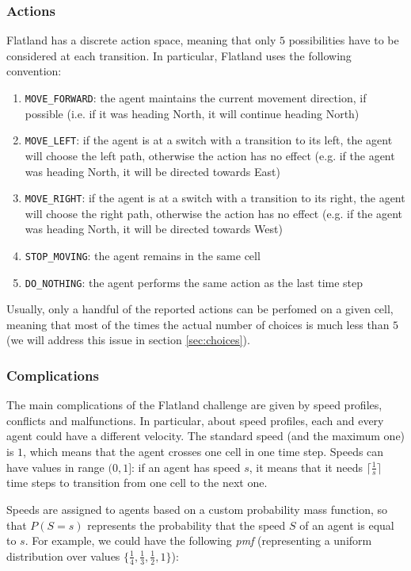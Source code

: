 \documentclass[a4paper,10pt]{report}
\begin{document}
\subsubsection*{Actions}
Flatland has a discrete action space, meaning that only $5$ possibilities have to be considered at each transition. In particular, Flatland uses the following convention:
\begin{enumerate}
	\item \texttt{MOVE_FORWARD}: the agent maintains the current movement direction, if possible (i.e. if it was heading North, it will continue heading North)
	\item \texttt{MOVE_LEFT}: if the agent is at a switch with a transition to its left, the agent will choose the left path, otherwise the action has no effect (e.g. if the agent was heading North, it will be directed towards East)
	\item \texttt{MOVE_RIGHT}: if the agent is at a switch with a transition to its right, the agent will choose the right path, otherwise the action has no effect (e.g. if the agent was heading North, it will be directed towards West)
	\item \texttt{STOP_MOVING}: the agent remains in the same cell
	\item \texttt{DO_NOTHING}: the agent performs the same action as the last time step
\end{enumerate}

Usually, only a handful of the reported actions can be perfomed on a given cell, meaning that most of the times the actual number of choices is much less than $5$ (we will address this issue in section \ref{sec:choices}).

\subsubsection*{Complications}
The main complications of the Flatland challenge are given by speed profiles, conflicts and malfunctions. In particular, about speed profiles, each and every agent could have a different velocity. The standard speed (and the maximum one) is $1$, which means that the agent crosses one cell in one time step. Speeds can have values in range $(0, 1]$: if an agent has speed $s$, it means that it needs $\lceil\frac{1}{s}\rceil$ time steps to transition from one cell to the next one.

Speeds are assigned to agents based on a custom probability mass function, so that $P(S=s)$ represents the probability that the speed $S$ of an agent is equal to $s$. For example, we could have the following \textit{pmf} (representing a uniform distribution over values $\{\frac{1}{4}, \frac{1}{3}, \frac{1}{2}, 1\}$):
\end{document}
